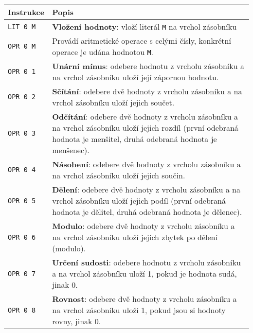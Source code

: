 \documentclass{article}
\begin{document}
	
	\begin{longtable}{|l| p{10cm}|}
		\hline
		Instrukce & Popis \\ 
		\hline\hline
		
		\rule{0pt}{3ex} \texttt{LIT 0 M} & \textbf{Vložení hodnoty}: vloží literál \texttt{M} na vrchol zásobníku \\ \hline
		
		\rule{0pt}{3ex} \texttt{OPR 0 M} & Provádí aritmetické operace s celými čísly, konkrétní operace je udána hodnotou \texttt{M}. \\
		
		\rule{0pt}{4ex} \texttt{OPR 0 1} & \textbf{Unární mínus}: odebere hodnotu z vrcholu zásobníku a na vrchol zásobníku uloží její zápornou hodnotu. \\
		
		\rule{0pt}{4ex} \texttt{OPR 0 2} & \textbf{Sčítání}: odebere dvě hodnoty z vrcholu zásobníku a na vrchol zásobníku uloží jejich součet. \\
		
		\rule{0pt}{4ex} \texttt{OPR 0 3} & \textbf{Odčítání}: odebere dvě hodnoty z vrcholu zásobníku a na vrchol zásobníku uloží jejich rozdíl (první odebraná hodnota je menšitel, druhá odebraná hodnota je menšenec). \\
		
		\rule{0pt}{4ex} \texttt{OPR 0 4} & \textbf{Násobení}: odebere dvě hodnoty z vrcholu zásobníku a na vrchol zásobníku uloží jejich součin. \\
		
		\rule{0pt}{4ex} \texttt{OPR 0 5} & \textbf{Dělení}: odebere dvě hodnoty z vrcholu zásobníku a na vrchol zásobníku uloží jejich podíl (první odebraná hodnota je dělitel, druhá odebraná hodnota je dělenec). \\
		
		\rule{0pt}{4ex} \texttt{OPR 0 6} & \textbf{Modulo}: odebere dvě hodnoty z vrcholu zásobníku a na vrchol zásobníku uloží jejich zbytek po dělení (modulo). \\
		
		\rule{0pt}{4ex} \texttt{OPR 0 7} & \textbf{Určení sudosti}: odebere hodnotu z vrcholu zásobníku a na vrchol zásobníku uloží 1, pokud je hodnota sudá, jinak 0. \\
		
		\rule{0pt}{4ex} \texttt{OPR 0 8} & \textbf{Rovnost}: odebere dvě hodnoty z vrcholu zásobníku a na vrchol zásobníku uloží 1, pokud jsou si hodnoty rovny, jinak 0. \\
		

\end{longtable}
\end{document}
